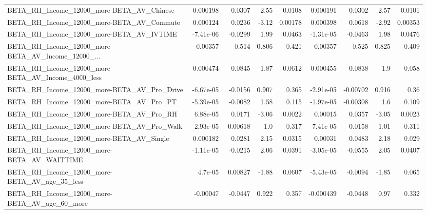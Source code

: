 \begin{tabular}{lrrrrrrrr}
BETA\_RH\_Income\_12000\_more-BETA\_AV\_Chinese          &   -0.000198 &      -0.0307 &      2.55 &   0.0108 &  -0.000191 &     -0.0302 &         2.57 &        0.0101 \\
BETA\_RH\_Income\_12000\_more-BETA\_AV\_Commute          &    0.000124 &       0.0236 &     -3.12 &  0.00178 &   0.000398 &      0.0618 &        -2.92 &       0.00353 \\
BETA\_RH\_Income\_12000\_more-BETA\_AV\_IVTIME           &   -7.41e-06 &      -0.0299 &      1.99 &   0.0463 &  -1.31e-05 &     -0.0463 &         1.98 &        0.0476 \\
BETA\_RH\_Income\_12000\_more-BETA\_AV\_Income\_12000\_... &     0.00357 &        0.514 &     0.806 &    0.421 &    0.00357 &       0.525 &        0.825 &         0.409 \\
BETA\_RH\_Income\_12000\_more-BETA\_AV\_Income\_4000\_less &    0.000474 &       0.0845 &      1.87 &   0.0612 &   0.000455 &      0.0838 &          1.9 &         0.058 \\
BETA\_RH\_Income\_12000\_more-BETA\_AV\_Pro\_Drive        &   -6.67e-05 &      -0.0156 &     0.907 &    0.365 &  -2.91e-05 &    -0.00702 &        0.916 &          0.36 \\
BETA\_RH\_Income\_12000\_more-BETA\_AV\_Pro\_PT           &   -5.39e-05 &      -0.0082 &      1.58 &    0.115 &  -1.97e-05 &    -0.00308 &          1.6 &         0.109 \\
BETA\_RH\_Income\_12000\_more-BETA\_AV\_Pro\_RH           &    6.88e-05 &       0.0171 &     -3.06 &   0.0022 &    0.00015 &      0.0357 &        -3.05 &        0.0023 \\
BETA\_RH\_Income\_12000\_more-BETA\_AV\_Pro\_Walk         &   -2.93e-05 &     -0.00618 &       1.0 &    0.317 &   7.41e-05 &      0.0158 &         1.01 &         0.311 \\
BETA\_RH\_Income\_12000\_more-BETA\_AV\_Single           &    0.000182 &       0.0281 &      2.15 &   0.0315 &    0.00031 &      0.0483 &         2.18 &         0.029 \\
BETA\_RH\_Income\_12000\_more-BETA\_AV\_WAITTIME         &   -1.11e-05 &      -0.0215 &      2.06 &   0.0391 &  -3.05e-05 &     -0.0555 &         2.05 &        0.0407 \\
BETA\_RH\_Income\_12000\_more-BETA\_AV\_age\_35\_less      &     4.7e-05 &      0.00827 &     -1.88 &   0.0607 &  -5.43e-05 &     -0.0094 &        -1.85 &         0.065 \\
BETA\_RH\_Income\_12000\_more-BETA\_AV\_age\_60\_more      &    -0.00047 &      -0.0447 &     0.922 &    0.357 &  -0.000439 &     -0.0448 &         0.97 &         0.332 \\

\end{tabular}
